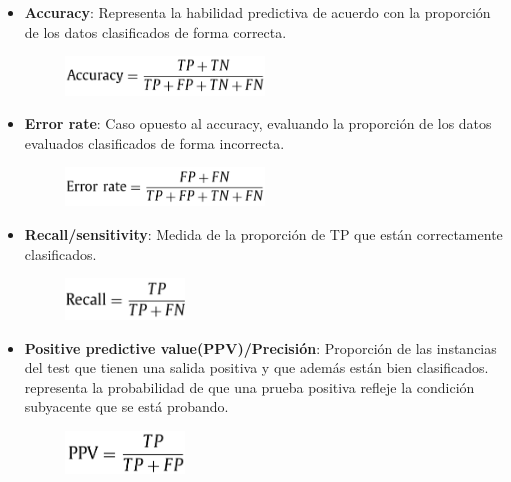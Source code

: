 \begin{itemize}
	\item \textbf{Accuracy}: Representa la habilidad predictiva de acuerdo con la proporción de 
	los datos clasificados de forma correcta.
	\begin{figure}[H]
		\centering
		\includegraphics[width=0.5\textwidth]{imagenes/f2} 
	\end{figure}

	\item \textbf{Error rate}: Caso opuesto al accuracy, evaluando la proporción de los datos
	evaluados clasificados de forma incorrecta.
	\begin{figure}[H]
		\centering
		\includegraphics[width=0.5\textwidth]{imagenes/f3} 
	\end{figure}

	\item \textbf{Recall/sensitivity}: Medida de la proporción de TP que están correctamente clasificados.
	\begin{figure}[H]
		\centering
		\includegraphics[width=0.3\textwidth]{imagenes/f4} 
	\end{figure}

	\item \textbf{Positive predictive value(PPV)/Precisión}: Proporción de las instancias del test que tienen una
	salida positiva y que además están bien clasificados.
	representa la probabilidad de que una prueba positiva 
	refleje la condición subyacente que se está probando.
	\begin{figure}[H]
		\centering
		\includegraphics[width=0.3\textwidth]{imagenes/f5} 
	\end{figure}
\end{itemize}




